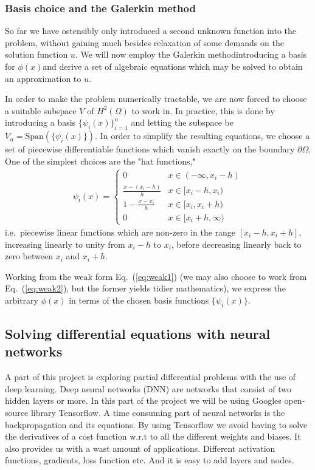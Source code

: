 \documentclass[a4paper, twocolumn]{article}
\newcommand{\eq} [1]{Eq.\ (\ref{eq:#1})}
\begin{document}
\subsubsection{Basis choice and the Galerkin method}
So far we have ostensibly only introduced a second unknown function into the problem, without gaining much besides relaxation of some demands on the solution function $u$. We will now employ the Galerkin method\textemdash introducing a basis for $\phi(x)$\textemdash and derive a set of algebraic equations which may be solved to obtain an approximation to $u$. 

In order to make the problem numerically tractable, we are now forced to choose a suitable subspace $V$ of $H^2(\Omega)$ to work in. In practice, this is done by introducing a basis $\{\psi_i(x)\}_{i=1}^n$ and letting the subspace be $V_n=\text{Span}(\{\psi_i(x)\})$. In order to simplify the resulting equations, we choose a set of piecewise differentiable functions which vanish exactly on the boundary $\partial \Omega$. One of the simplest choices are the "hat functions,"
\begin{align}
\psi_i(x)=\left\{ \begin{matrix}
0                   & x\in (-\infty, x_i-h) \\%
\frac{x-(x_i-h)}{h} & x\in [x_i-h, x_i) \\%
1- \frac{x-x_i}{h}  & x\in [x_i, x_i+h) \\%
0                   & x\in [x_i+h, \infty)%
\end{matrix}\right.
\end{align}
i.e.\ piecewise linear functions which are non-zero in the range $[x_i-h, x_i+h]$, increasing linearly to unity from $x_i-h$ to $x_i$, before decreasing linearly back to zero between $x_i$ and $x_i+h$. 

Working from the weak form \eq{weak1} (we may also choose to work from \eq{weak2}, but the former yields tidier mathematics), we express the arbitrary $\phi(x)$ in terms of the chosen basis functions $\{\psi_i(x)\}$.


\subsection{Solving differential equations with neural networks}
A part of this project is exploring partial differential problems with the use of deep learning. Deep neural networks (DNN) are networks that consist of two hidden layers or more. In this part of the project we will be using Googles open-source library Tensorflow. A time consuming part of neural networks is the backpropagation and its equations. By using Tensorflow we avoid having to solve the derivatives of a cost function w.r.t to all the different weights and biases. It also provides us with a wast amount of applications. Different activation functions, gradients, loss function etc. And it is easy to add layers and nodes. 
\end{document}
